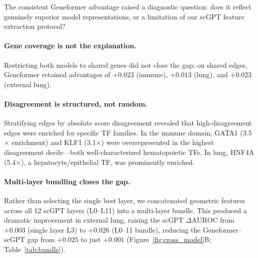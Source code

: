 \documentclass[11pt]{article}
\newcommand{\DAURC}{\Delta\mathrm{AUROC}}
\begin{document}
The consistent Geneformer advantage raised a diagnostic question: does it reflect genuinely superior model representations, or a limitation of our scGPT feature extraction protocol?

\paragraph{Gene coverage is not the explanation.}
Restricting both models to shared genes did not close the gap: on shared edges, Geneformer retained advantages of $+0.023$ (immune), $+0.013$ (lung), and $+0.023$ (external lung).

\paragraph{Disagreement is structured, not random.}
Stratifying edges by absolute score disagreement revealed that high-disagreement edges were enriched for specific TF families.
In the immune domain, GATA1 (3.5$\times$ enrichment) and KLF1 (3.1$\times$) were overrepresented in the highest disagreement decile---both well-characterized hematopoietic TFs.
In lung, HNF4A (5.4$\times$), a hepatocyte/epithelial TF, was prominently enriched.

\paragraph{Multi-layer bundling closes the gap.}
Rather than selecting the single best layer, we concatenated geometric features across all 12 scGPT layers (L0--L11) into a multi-layer bundle.
This produced a dramatic improvement in external lung, raising the scGPT $\DAURC$ from $+0.003$ (single layer L3) to $+0.026$ (L0--11 bundle), reducing the Geneformer--scGPT gap from $+0.025$ to just $+0.001$ (Figure~\ref{fig:cross_model}B; Table~\ref{tab:bundle}).
\end{document}
